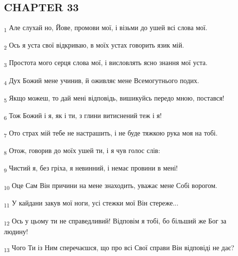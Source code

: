 \subsection{CHAPTER 33}
\begin{tcolorbox}
\textsubscript{1} Але слухай но, Йове, промови мої, і візьми до ушей всі слова мої.
\end{tcolorbox}
\begin{tcolorbox}
\textsubscript{2} Ось я уста свої відкриваю, в моїх устах говорить язик мій.
\end{tcolorbox}
\begin{tcolorbox}
\textsubscript{3} Простота мого серця слова мої, і висловлять ясно знання мої уста.
\end{tcolorbox}
\begin{tcolorbox}
\textsubscript{4} Дух Божий мене учинив, й оживляє мене Всемогутнього подих.
\end{tcolorbox}
\begin{tcolorbox}
\textsubscript{5} Якщо можеш, то дай мені відповідь, вишикуйсь передо мною, постався!
\end{tcolorbox}
\begin{tcolorbox}
\textsubscript{6} Тож Божий і я, як і ти, з глини витиснений теж і я!
\end{tcolorbox}
\begin{tcolorbox}
\textsubscript{7} Ото страх мій тебе не настрашить, і не буде тяжкою рука моя на тобі.
\end{tcolorbox}
\begin{tcolorbox}
\textsubscript{8} Отож, говорив до моїх ушей ти, і я чув голос слів:
\end{tcolorbox}
\begin{tcolorbox}
\textsubscript{9} Чистий я, без гріха, я невинний, і немає провини в мені!
\end{tcolorbox}
\begin{tcolorbox}
\textsubscript{10} Оце Сам Він причини на мене знаходить, уважає мене Собі ворогом.
\end{tcolorbox}
\begin{tcolorbox}
\textsubscript{11} У кайдани закув мої ноги, усі стежки мої Він стереже...
\end{tcolorbox}
\begin{tcolorbox}
\textsubscript{12} Ось у цьому ти не справедливий! Відповім я тобі, бо більший же Бог за людину!
\end{tcolorbox}
\begin{tcolorbox}
\textsubscript{13} Чого Ти із Ним сперечаєшся, що про всі Свої справи Він відповіді не дає?
\end{tcolorbox}
